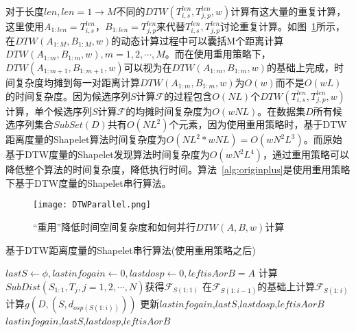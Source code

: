 对于长度$len,len=1\to M$不同的$DTW(T_{i,s}^{len},T_{j,p}^{len},w)$计算有这大量的重复计算，这里使用$A_{1:len}=T_{i,s}^{len}$，$B_{1:len}=T_{j,p}^{len}$来代替$T_{i,s}^{len},T_{j,p}^{len}$讨论重复计算。如图~\ref{fig:DTWParallel}所示，在$DTW(A_{1:M},B_{1:M},w)$的动态计算过程中可以囊括M个距离计算$DTW(A_{1:m},B_{1:m},w),m=1,2,\cdots,M$。而在使用重用策略下，$DTW(A_{1:m+1},B_{1:m+1},w)$可以视为在$DTW(A_{1:m},B_{1:m},w)$的基础上完成，时间复杂度均摊到每一对距离计算$DTW(A_{1:m},B_{1:m},w)$为$O(w)$而不是$O(wL)$的时间复杂度。因为候选序列$S$计算$\mathcal{F}$的过程包含$O(NL)$个$DTW(T_{i,s}^{len},T_{j,p}^{len},w)$计算，单个候选序列$S$计算$\mathcal{F}$的均摊时间复杂度为$O(wNL)$。在数据集$D$所有候选序列集合$SubSet(D)$共有$O(NL^2)$个元素，因为使用重用策略时，基于DTW距离度量的Shapelet算法时间复杂度为$O(NL^2*wNL)=O(wN^2L^3)$。而原始基于DTW度量的Shapelet发现算法时间复杂度为$O(wN^2L^4)$，通过重用策略可以降低整个算法的时间复杂度，降低执行时间。算法~\ref{alg:originplus}是使用重用策略下基于DTW度量的Shapelet串行算法。
\begin{figure}[H] %
	\centering
	\texttt{[image: DTWParallel.png]}
	\caption{“重用”降低时间空间复杂度和如何并行$DTW(A,B,w)$计算}
	\label{fig:DTWParallel}
\end{figure}
\begin{algorithm}
	\caption{基于DTW距离度量的Shapelet串行算法(使用重用策略之后)}
	\label{alg:originplus}
	\begin{algorithmic}[1]
			\State $lastS \gets \phi, lastinfogain \gets 0, lastdosp \gets 0, leftisAorB = A$
						\State 计算$SubDist(S_{1:1},T_j,j=1,2,\cdots,N)$获得$\mathcal{F}_{S(1:1)}$ \label{dtw1}
					\Else
						\State 在$\mathcal{F}_{S(1:i-1)}$的基础上计算$\mathcal{F}_{S(1:i)}$ \label{dtw16basedtw15}
					\EndIf
					\State 计算$g(D,(S,d_{osp(S(1:i))}))$
						\State 更新$lastinfogain$,$lastS$,$lastdosp$,$leftisAorB$
					\EndIf
				\EndFor
			\EndFor
			\State \Return $lastinfogain$,$lastS$,$lastdosp$,$leftisAorB$
		\EndFunction
	\end{algorithmic}
\end{algorithm}

